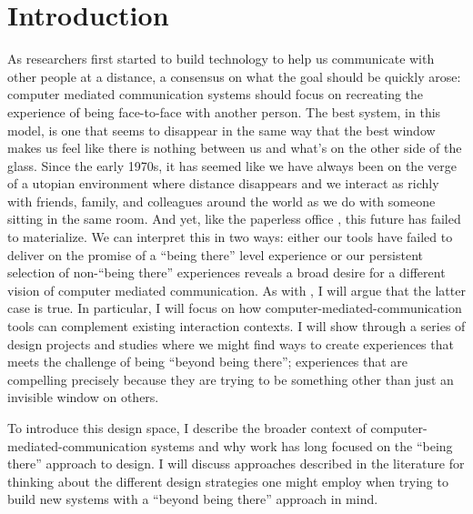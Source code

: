 \chapter{Introduction}
\label{ch:intro}


As researchers first started to build technology to help us communicate with other people at a distance, a consensus on what the goal should be quickly arose: computer mediated communication systems should focus on recreating the experience of being face-to-face with another person. The best system, in this model, is one that seems to disappear in the same way that the best window makes us feel like there is nothing between us and what's on the other side of the glass. Since the early 1970s, it has seemed like we have always been on the verge of a utopian environment where distance disappears and we interact as richly with friends, family, and colleagues around the world as we do with someone sitting in the same room. \citep{Egido:1988vq} And yet, like the paperless office \citep{Sellen:2001uk}, this future has failed to materialize. We can interpret this in two ways: either our tools have failed to deliver on the promise of a ``being there'' level experience or our persistent selection of non-``being there'' experiences reveals a broad desire for a different vision of computer mediated communication. As with \citet{Hollan:1992tz}, I will argue that the latter case is true. In particular, I will focus on how  computer-mediated-communication tools can complement existing interaction contexts. I will show through a series of design projects and studies where we might find ways to create experiences that meets the challenge of being ``beyond being there''; experiences that are compelling precisely because they are trying to be something other than just an invisible window on others.

To introduce this design space, I describe the broader context of computer-mediated-communication systems and why work has long focused on the ``being there'' approach to design. I will discuss approaches described in the literature for thinking about the different design strategies one might employ when trying to build new systems with a ``beyond being there'' approach in mind.



